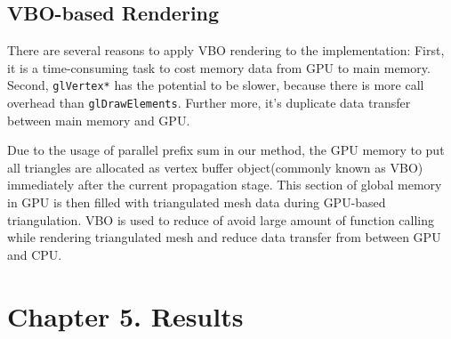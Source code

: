 \documentclass[11pt, b5paper]{report}
\begin{document}



\section{VBO-based Rendering}

There are several reasons to apply VBO rendering to the implementation:
First, it is a time-consuming task to cost memory data from GPU to main 
memory. Second, \texttt{glVertex*} has the potential to be slower, because
there is more call overhead than \texttt{glDrawElements}.
Further more, it's duplicate data transfer between main memory and GPU.


Due to the usage of parallel prefix sum in our method, the GPU memory to put
all triangles are allocated as vertex buffer object(commonly known as VBO) 
immediately after the current propagation stage. This section of global memory
in GPU is then filled with triangulated mesh data during GPU-based 
triangulation. VBO is used to reduce of avoid large amount of function calling
while rendering triangulated mesh and reduce data transfer from between GPU
and CPU.




% 
\chapter*{Chapter 5. Results}
\setcounter{tocdepth}{0}
\setcounter{chapter}{5}
\setcounter{section}{0}
\label{ch:results}
\end{document}
